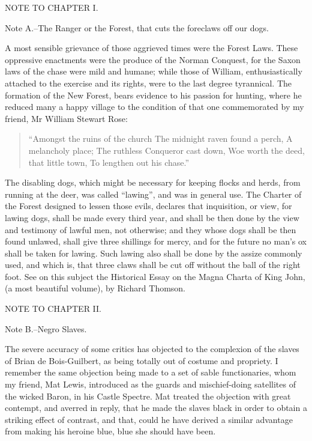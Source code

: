 NOTE TO CHAPTER I.

Note A.--The Ranger or the Forest, that cuts the foreclaws off our dogs.

A most sensible grievance of those aggrieved times were the Forest Laws.
These oppressive enactments were the produce of the Norman Conquest, for
the Saxon laws of the chase were mild and humane; while those of
William, enthusiastically attached to the exercise and its rights, were
to the last degree tyrannical. The formation of the New Forest, bears
evidence to his passion for hunting, where he reduced many a happy
village to the condition of that one commemorated by my friend, Mr
William Stewart Rose:

\begin{quote}
``Amongst the ruins of the church
The midnight raven found a perch,
A melancholy place;
The ruthless Conqueror cast down,
Woe worth the deed, that little town,
To lengthen out his chase.''
\end{quote}

The disabling dogs, which might be necessary for keeping flocks and
herds, from running at the deer, was called ``lawing'', and was in
general use. The Charter of the Forest designed to lessen those evils,
declares that inquisition, or view, for lawing dogs, shall be made every
third year, and shall be then done by the view and testimony of lawful
men, not otherwise; and they whose dogs shall be then found unlawed,
shall give three shillings for mercy, and for the future no man's ox
shall be taken for lawing. Such lawing also shall be done by the assize
commonly used, and which is, that three claws shall be cut off without
the ball of the right foot. See on this subject the Historical Essay on
the Magna Charta of King John, (a most beautiful volume), by Richard
Thomson.

NOTE TO CHAPTER II.

Note B.--Negro Slaves.

The severe accuracy of some critics has objected to the complexion of
the slaves of Brian de Bois-Guilbert, as being totally out of costume
and propriety. I remember the same objection being made to a set of
sable functionaries, whom my friend, Mat Lewis, introduced as the guards
and mischief-doing satellites of the wicked Baron, in his Castle
Spectre. Mat treated the objection with great contempt, and averred in
reply, that he made the slaves black in order to obtain a striking
effect of contrast, and that, could he have derived a similar advantage
from making his heroine blue, blue she should have been.

